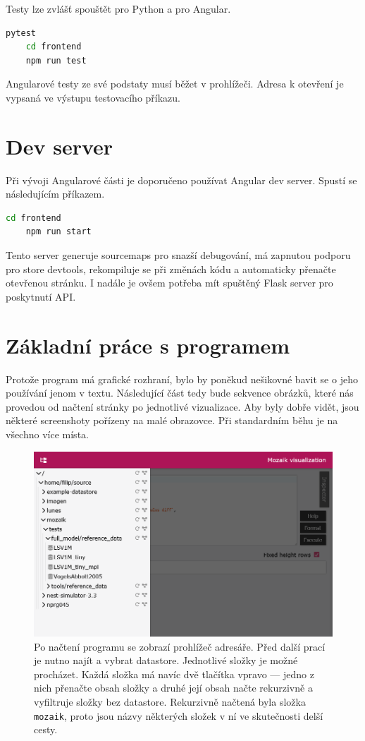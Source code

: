 Testy lze zvlášť spouštět pro Python a pro Angular.

\begin{lstlisting}[language=bash]
	pytest
	cd frontend
	npm run test
\end{lstlisting}

Angularové testy ze své podstaty musí běžet v prohlížeči. Adresa k otevření je vypsaná ve výstupu testovacího příkazu.

\section{Dev server}

Při vývoji Angularové části je doporučeno používat Angular dev server. Spustí se následujícím příkazem.

\begin{lstlisting}[language=bash]
	cd frontend
	npm run start
\end{lstlisting}

Tento server generuje sourcemaps pro snazší debugování, má zapnutou podporu pro store devtools, rekompiluje se při změnách kódu a automaticky přenačte otevřenou stránku. I nadále je ovšem potřeba mít spuštěný Flask server pro poskytnutí API.

\section{Základní práce s programem}

Protože program má grafické rozhraní, bylo by poněkud nešikovné bavit se o jeho používání jenom v textu. Následující část tedy bude sekvence obrázků, které nás provedou od načtení stránky po jednotlivé vizualizace. Aby byly dobře vidět, jsou některé screenshoty pořízeny na malé obrazovce. Při standardním běhu je na všechno více místa.

\begin{figure}
	\centering
	\includegraphics[width=1\linewidth]{img/screenshot_filesystem.png}
	\caption{Po načtení programu se zobrazí prohlížeč adresáře. Před další prací je nutno najít a vybrat datastore. Jednotlivé složky je možné procházet. Každá složka má navíc dvě tlačítka vpravo --- jedno z nich přenačte obsah složky a druhé její obsah načte rekurzivně a vyfiltruje složky bez datastore. Rekurzivně načtená byla složka \lstinline|mozaik|, proto jsou názvy některých složek v ní ve skutečnosti delší cesty.}
	\label{fig:filesystem}
\end{figure}

